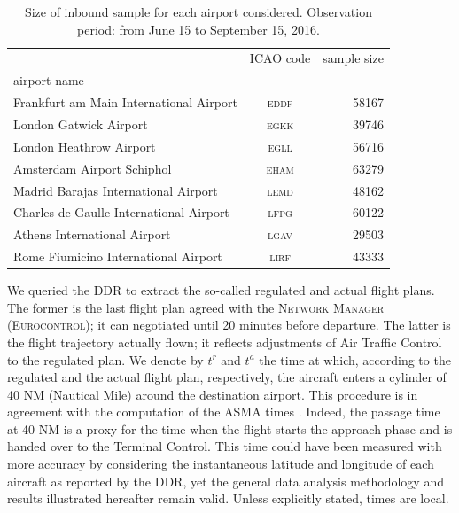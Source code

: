 \documentclass[draft,review]{elsarticle}
\newcommand{\airp}[1]{\textcolor{#1}{\textsc{#1}}}
\begin{document}
\begin{table}[tbp]
  \caption{Size of inbound sample for each airport considered. Observation period: from June 15 to September 15, 2016.}\label{tab:flights_count}
    \begin{tabular}{lcr}
      \toprule
      {} & \acs{ICAO} code &  sample size \\
      airport name                                       &                 &              \\
      \midrule
      Frankfurt am Main International Airport &     \airp{eddf} &        58167 \\
      London Gatwick Airport                  &     \airp{egkk} &        39746 \\
      London Heathrow Airport                 &     \airp{egll} &        56716 \\
      Amsterdam Airport Schiphol              &     \airp{eham} &        63279 \\
      Madrid Barajas International Airport    &     \airp{lemd} &        48162 \\
      Charles de Gaulle International Airport &     \airp{lfpg} &        60122 \\
      Athens International Airport            &     \airp{lgav} &        29503 \\
      Rome Fiumicino International Airport    &     \airp{lirf} &        43333 \\
      \bottomrule
    \end{tabular}
\end{table}

We queried the DDR to extract the so-called regulated and actual flight plans.
The former is the last flight plan agreed with the \textsc{Network Manager (Eurocontrol)}; it can negotiated until 20 minutes before departure. The latter is the flight trajectory actually flown; it reflects adjustments of Air Traffic Control to the regulated plan.
We denote by \(t^r\) and \(t^a\) the time at which, according to the regulated and the actual flight plan, respectively, the aircraft enters a cylinder of 40 NM (Nautical Mile) around the destination airport.
This procedure is in agreement with the computation of the ASMA times \citep{ASMA-def}.
Indeed, the passage time at 40 NM is a proxy for the time when the flight starts the approach phase and is handed over to the Terminal Control.
This time could have been measured with more accuracy by considering the instantaneous latitude and longitude of each aircraft as reported by the \ac{DDR}, yet the general data analysis methodology and results illustrated hereafter remain valid.
Unless explicitly stated, times are local.
\end{document}
